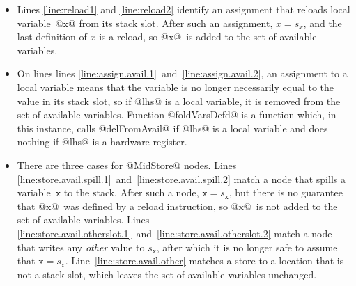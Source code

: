 \documentclass[blockstyle,preprint,nocopyrightspace]{sigplanconf}
\newcommand\linepairref[2]{lines \ref{line:#1}~and~\ref{line:#2}}
\newcommand\Lineref[1]{Line~\ref{line:#1}}
\newcommand\Linepairref[2]{Lines \ref{line:#1}~and~\ref{line:#2}}
\newcommand\slotof[1]{\ensuremath{s_{#1}}}
\let\slotOf=\slotof
\newcommand{\authornote}[1]{{\em #1}}
\def\authornote#1{\unskip\relax}
\newcommand{\simon}[1]{\authornote{SLPJ: #1}}
\newcommand{\norman}[1]{\authornote{NR: #1}}
\let\remark\norman
\def\finalremark#1{\relax}
\newcommand{\john}[1]{\authornote{JD: #1}}
\begin{document}
\begin{itemize}
\item
Lines \ref{line:reload1} and \ref{line:reload2}
identify an assignment that reloads local
variable~@x@ from its stack slot.\finalremark{I propose the compiler be
modified to use @isStackSlotOf@ as I've written. JD~approves.}
After such an assignment, $x = \slotof x$,
and the last definition of $x$ is a reload,
so @x@~is added to the set of available variables.\remark{Check these bullets against the figure for correctness}
\item
On lines \linepairref{assign.avail.1}{assign.avail.2},
an assignment to a local variable means that the
variable is no longer necessarily equal to the value in its stack
slot, so if @lhs@ is a local variable, it is removed from the set of
available variables.
Function @foldVarsDefd@ is a function which, in this
instance, calls @delFromAvail@ if @lhs@ is a local variable and does
nothing if @lhs@ is a hardware register.
\item 
There are three cases for @MidStore@ nodes.
\Linepairref{store.avail.spill.1}{store.avail.spill.2}
match a node that spills a variable~$\mathtt{x}$ to the stack.
After such a node, $\mathtt{x} = \slotOf {\mathtt{x}}$,
but there is no guarantee that @x@~was defined by a reload instruction,
so @x@~is not added to the set of available variables.
%
\Linepairref{store.avail.otherslot.1}{store.avail.otherslot.2}
match a node that writes any \emph{other} value to \slotOf {\mathtt x},
after which it is no longer safe to assume that $\mathtt x = \slotof {\mathtt{x}}$.
%
\Lineref{store.avail.other} matches a store to a location that is not
a stack slot, which leaves the set of available variables unchanged.




\end{itemize}
\end{document}
